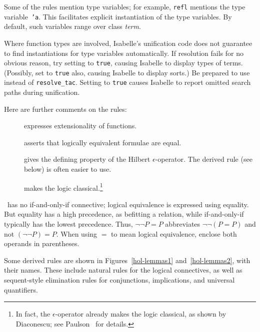 Some of the rules mention type variables; for example, {\tt refl} mentions
the type variable~{\tt'a}.  This facilitates explicit instantiation of the
type variables.  By default, such variables range over class {\it term}.  

\begin{warn}
Where function types are involved, Isabelle's unification code does not
guarantee to find instantiations for type variables automatically.  If
resolution fails for no obvious reason, try setting  to
{\tt true}, causing Isabelle to display types of terms.  (Possibly, set
 to {\tt true} also, causing Isabelle to display sorts.)
Be prepared to use  instead of {\tt resolve_tac}.
Setting  to {\tt true} causes Isabelle to
report omitted search paths during unification.
\end{warn}

Here are further comments on the rules:
\begin{description}
\item[] 
expresses extensionality of functions.
\item[] 
asserts that logically equivalent formulae are equal.
\item[] 
gives the defining property of the Hilbert $\epsilon$-operator.  The
derived rule  (see below) is often easier to use.
\item[] 
makes the logic classical.\footnote{In fact, the $\epsilon$-operator
already makes the logic classical, as shown by Diaconescu;
see Paulson~\cite{paulson-COLOG} for details.}
\end{description}

\begin{warn}
\HOL\ has no if-and-only-if connective; logical equivalence is expressed
using equality.  But equality has a high precedence, as befitting a
relation, while if-and-only-if typically has the lowest precedence.  Thus,
$\neg\neg P=P$ abbreviates $\neg\neg (P=P)$ and not $(\neg\neg P)=P$.  When
using $=$ to mean logical equivalence, enclose both operands in
parentheses.
\end{warn}

Some derived rules are shown in Figures~\ref{hol-lemmas1}
and~\ref{hol-lemmas2}, with their {\ML} names.  These include natural rules
for the logical connectives, as well as sequent-style elimination rules for
conjunctions, implications, and universal quantifiers.  

